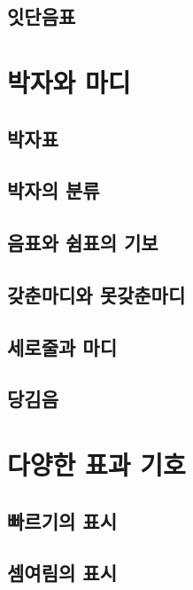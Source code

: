\documentclass[12pt, a4paper, oneside]{book}
\let\stdsection\section
\renewcommand\section{\newpage\stdsection}
\begin{document}
	\subsection{잇단음표}



%
	\section{박자와 마디}

	\subsection{박자표 }

	\subsection{박자의 분류}

	\subsection{음표와 쉼표의 기보}
	\subsection{갖춘마디와 못갖춘마디}
	\subsection{세로줄과 마디}
	\subsection{당김음}


%
	\section{다양한 표과 기호}

	\subsection{빠르기의 표시}
	\subsection{셈여림의 표시}
\end{document}

